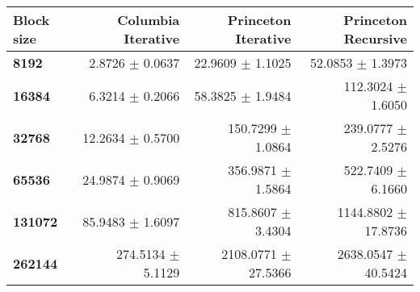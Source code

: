 \begin{tabular}{lrrr}\toprule
\textbf{Block size}  & \textbf{Columbia Iterative} & \textbf{Princeton Iterative} & \textbf{Princeton Recursive}\\\midrule
\textbf{8192}  & 2.8726 $\pm$ 0.0637 & 22.9609 $\pm$ 1.1025 & 52.0853 $\pm$ 1.3973\\
\textbf{16384}  & 6.3214 $\pm$ 0.2066 & 58.3825 $\pm$ 1.9484 & 112.3024 $\pm$ 1.6050\\
\textbf{32768}  & 12.2634 $\pm$ 0.5700 & 150.7299 $\pm$ 1.0864 & 239.0777 $\pm$ 2.5276\\
\textbf{65536}  & 24.9874 $\pm$ 0.9069 & 356.9871 $\pm$ 1.5864 & 522.7409 $\pm$ 6.1660\\
\textbf{131072}  & 85.9483 $\pm$ 1.6097 & 815.8607 $\pm$ 3.4304 & 1144.8802 $\pm$ 17.8736\\
\textbf{262144} & 274.5134 $\pm$ 5.1129 & 2108.0771 $\pm$ 27.5366 & 2638.0547 $\pm$ 40.5424\\
\bottomrule
\end{tabular}
